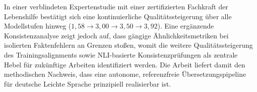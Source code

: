 In einer verblindeten Expertenstudie mit einer zertifizierten Fachkraft der Lebenshilfe bestätigt sich eine kontinuierliche Qualitätssteigerung über alle Modellstufen hinweg ($1{,}58 \to 3{,}00 \to 3{,}50 \to 3{,}92$). Eine ergänzende Konsistenzanalyse zeigt jedoch auf, dass gängige Ähnlichkeitsmetriken bei isolierten Faktenfehlern an Grenzen stoßen, womit die weitere Qualitätssteigerung des Trainingsalignments sowie NLI-basierte Konsistenzprüfungen als zentrale Hebel für zukünftige Arbeiten identifiziert werden. Die Arbeit liefert damit den methodischen Nachweis, dass eine autonome, referenzfreie Übersetzungspipeline für deutsche Leichte Sprache prinzipiell realisierbar ist.
